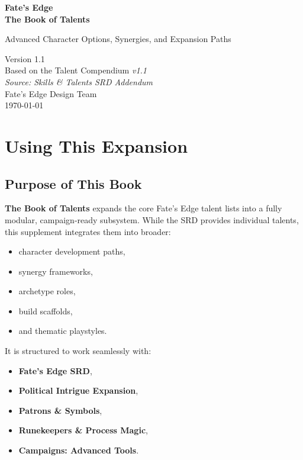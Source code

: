 \documentclass[11pt]{book}
\begin{document}
\begin{titlepage}
    \centering
    {\Huge\bfseries Fate's Edge\\[0.3em]
    \textcolor{feBlue}{The Book of Talents}\par}
    \vspace{1.5cm}
    {\Large Advanced Character Options, Synergies, and Expansion Paths\par}
    \vfill
    {\large Version 1.1}\\[0.3em]
    {\large Based on the Talent Compendium \textit{v1.1}}\\
    {\large \textit{Source: Skills \& Talents SRD Addendum}}\\
    \vspace{1cm}
    {\large Fate's Edge Design Team}\\
    \vspace{0.5cm}
    {\small \today}
    \vfill
\end{titlepage}

\tableofcontents
\newpage

\chapter{Using This Expansion}

\section{Purpose of This Book}

\textbf{The Book of Talents} expands the core Fate's Edge talent lists into a fully modular,
campaign-ready subsystem. While the SRD provides individual talents, this supplement
integrates them into broader:
\begin{itemize}
    \item character development paths,
    \item synergy frameworks,
    \item archetype roles,
    \item build scaffolds,
    \item and thematic playstyles.
\end{itemize}

It is structured to work seamlessly with:
\begin{itemize}
    \item \textbf{Fate's Edge SRD},
    \item \textbf{Political Intrigue Expansion},
    \item \textbf{Patrons \& Symbols},
    \item \textbf{Runekeepers \& Process Magic},
    \item \textbf{Campaigns: Advanced Tools}.
\end{itemize}
\end{document}
